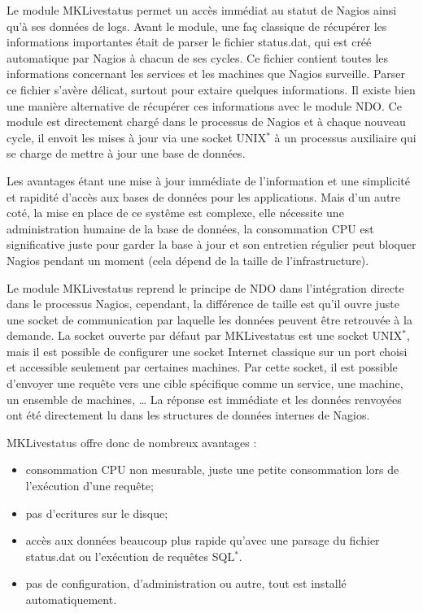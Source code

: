 Le module MKLivestatus permet un acc\`es imm\'ediat au statut de Nagios ainsi qu'\`a ses donn\'ees de logs.
Avant le module, une fa\c{c} classique de r\'ecup\'erer les informations importantes \'etait de parser le fichier \textsf{status.dat}, qui est cr\'e\'e automatique par Nagios \`a chacun de ses cycles.
Ce fichier contient toutes les informations concernant les services et les machines que Nagios surveille.
Parser ce fichier s'av\`ere d\'elicat, surtout pour extaire quelques informations.
Il existe bien une mani\`ere alternative de r\'ecup\'erer ces informations avec le module NDO.
Ce module est directement charg\'e dans le processus de Nagios et \`a chaque nouveau cycle, il envoit les mises \`a jour via une socket UNIX$^*$ \`a un processus auxiliaire qui se charge de mettre \`a jour une base de donn\'ees.

Les avantages \'etant une mise \`a jour imm\'ediate de l'information et une simplicit\'e et rapidit\'e d'acc\`es aux bases de donn\'ees pour les applications.
Mais d'un autre cot\'e, la mise en place de ce syst\^eme est complexe, elle n\'ecessite une administration humaine de la base de donn\'ees, la consommation CPU est significative juste pour garder la base \`a jour et son entretien r\'egulier peut bloquer Nagios pendant un moment (cela d\'epend de la taille de l'infrastructure).

Le module MKLivestatus reprend le principe de NDO dans l'int\'egration directe dans le processus Nagios, cependant, la diff\'erence de taille est qu'il ouvre juste une socket de communication par laquelle les donn\'ees peuvent \^etre retrouv\'ee \`a la demande.
La socket ouverte par d\'efaut par MKLivestatus est une socket UNIX$^*$, mais il est possible de configurer une socket Internet classique sur un port choisi et accessible seulement par certaines machines.
Par cette socket, il est possible d'envoyer une requ\^ete vers une cible sp\'ecifique comme un service, une machine, un ensemble de machines, \ldots{}
La r\'eponse est imm\'ediate et les donn\'ees renvoy\'ees ont \'et\'e directement lu dans les structures de donn\'ees internes de Nagios.

\noindent MKLivestatus offre donc de nombreux avantages :

\begin{itemize}
	\item consommation CPU non mesurable, juste une petite consommation lors de l'ex\'ecution d'une requ\^ete;
	\item pas d'ecritures sur le disque;
	\item acc\`es aux donn\'ees beaucoup plus rapide qu'avec une parsage du fichier \textsf{status.dat} ou l'ex\'ecution de requ\^etes SQL$^*$.
	\item pas de configuration, d'administration ou autre, tout est install\'e automatiquement.

\end{itemize}

